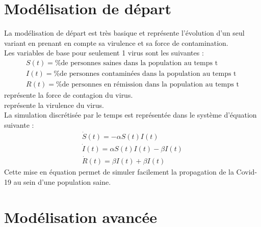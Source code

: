 \documentclass{article}
\begin{document}
\section{Modélisation de départ}

La modélisation de départ est très basique et représente l'évolution d'un seul variant en prenant en compte sa virulence et sa force de contamination.\\
\noindent
Les variables de base pour seulement 1 virus sont les suivantes :
\begin{align}
    S(t)= \text{\% de personnes saines dans la population au temps t} \\
    I(t)= \text{\% de personnes contaminées dans la population au temps t} \\
    R(t)= \text{\% de personnes en rémission dans la population au temps t}
\end{align}
\noindent
\textalpha \space représente la force de contagion du virus. \\
\textbeta \space représente la virulence du virus. \\
\noindent
La simulation discrétisée par le temps est représentée dans le système d'équation suivante :
\begin{align}
    \dot{S}(t)= -\alpha S(t)I(t) \\
    \dot{I}(t)= \alpha S(t)I(t)-\beta I(t) \\
    \dot{R}(t)= \beta I(t) + \beta I(t)
\end{align}
\noindent
Cette mise en équation permet de simuler facilement la propagation de la Covid-19 au sein d'une population saine.\\

\section{Modélisation avancée}
\end{document}
